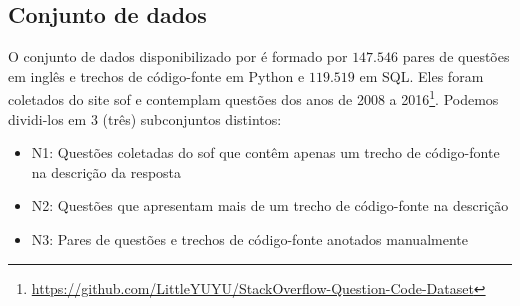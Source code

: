 \subsection{Conjunto de dados}
\label{sec:conjunto-dados}

O conjunto de dados disponibilizado por \cite{yao-2018} é formado por $\bm{147.546}$ pares de questões em inglês e trechos de código-fonte em Python e $\bm{119.519}$ em SQL. Eles foram coletados do site \Gls{sof} e contemplam questões dos anos de 2008 a 2016\footnote{\url{https://github.com/LittleYUYU/StackOverflow-Question-Code-Dataset}}. Podemos dividi-los em 3 (três) subconjuntos distintos:

\begin{itemize}
    \item N1: Questões coletadas do \Gls{sof} que contêm apenas um trecho de código-fonte na descrição da resposta
    \item N2: Questões que apresentam mais de um trecho de código-fonte na descrição
    \item N3: Pares de questões e trechos de código-fonte anotados manualmente
\end{itemize}



